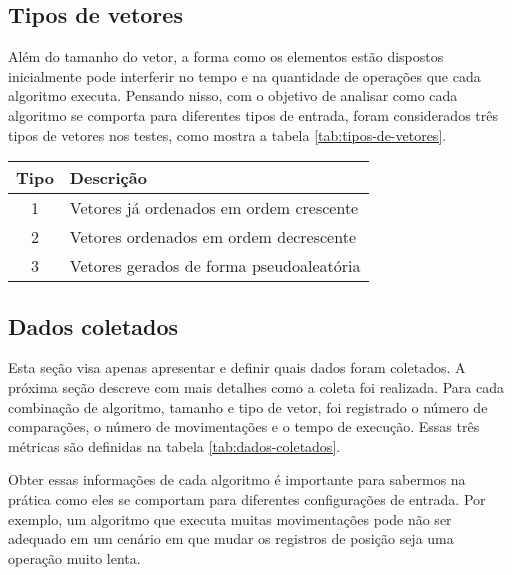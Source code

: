 \subsection{Tipos de vetores}
Além do tamanho do vetor, a forma como os elementos estão dispostos inicialmente pode interferir no tempo e na quantidade de operações que cada algoritmo executa. Pensando nisso, com o objetivo de analisar como cada algoritmo se comporta para diferentes tipos de entrada, foram considerados três tipos de vetores nos testes, como mostra a tabela \ref{tab:tipos-de-vetores}.

\begin{table}[H]
    \centering
    \begin{tabular}{ | c | l | }
        \hline
        Tipo   & Descrição                                \\
        \hline
        1      & Vetores já ordenados em ordem crescente  \\
        2      & Vetores ordenados em ordem decrescente   \\
        3      & Vetores gerados de forma pseudoaleatória \\
        \hline
    \end{tabular}
\end{table}

\subsection{Dados coletados}
Esta seção visa apenas apresentar e definir quais dados foram coletados. A próxima seção descreve com mais detalhes como a coleta foi realizada. Para cada combinação de algoritmo, tamanho e tipo de vetor, foi registrado o número de comparações, o número de movimentações e o tempo de execução. Essas três métricas são definidas na tabela \ref{tab:dados-coletados}.

Obter essas informações de cada algoritmo é importante para sabermos na prática como eles se comportam para diferentes configurações de entrada. Por exemplo, um algoritmo que executa muitas movimentações pode não ser adequado em um cenário em que mudar os registros de posição seja uma operação muito lenta.

